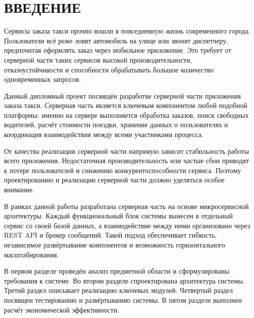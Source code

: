 \sectionbreak
\section*{
	\gostTitleFont
	\redline
	ВВЕДЕНИЕ
}
\subtitlespace
{\gostFont
	\par \redline Сервисы заказа такси прочно вошли в повседневную жизнь современного города. Пользователи всё реже ловят автомобиль на улице или звонят диспетчеру, предпочитая оформлять заказ через мобильное приложение. Это требует от серверной части таких сервисов высокой производительности, отказоустойчивости и способности обрабатывать большое количество одновременных запросов.

	\par \redline Данный дипломный проект посвящён разработке серверной части приложения заказа такси. Серверная часть является ключевым компонентом любой подобной платформы: именно на сервере выполняется обработка заказов, поиск свободных водителей, расчёт стоимости поездки, хранение данных о пользователях и координация взаимодействия между всеми участниками процесса.

	\par \redline От качества реализации серверной части напрямую зависит стабильность работы всего приложения. Недостаточная производительность или частые сбои приводят к потере пользователей и снижению конкурентоспособности сервиса. Поэтому проектированию и реализации серверной части должно уделяться особое внимание.

	\par \redline В рамках данной работы разработана серверная часть на основе микросервисной архитектуры. Каждый функциональный блок системы вынесен в отдельный сервис со своей базой данных, а взаимодействие между ними организовано через REST API и брокер сообщений. Такой подход обеспечивает гибкость, независимое развёртывание компонентов и возможность горизонтального масштабирования.

	\par \redline В первом разделе проведён анализ предметной области и сформулированы требования к системе. Во втором разделе спроектирована архитектура системы. Третий раздел описывает реализацию ключевых модулей. Четвертый раздел посвящен тестированию и развёртыванию системы. В пятом разделе выполнен расчёт экономической эффективности.

	\par
}
